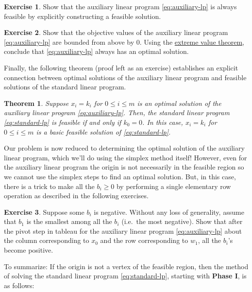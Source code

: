 \documentclass[
]{book}
\newtheorem{theorem}{Theorem}[chapter]
\theoremstyle{definition}
\theoremstyle{definition}
\theoremstyle{definition}
\newtheorem{exercise}{Exercise}[chapter]
\theoremstyle{definition}
\theoremstyle{remark}
\begin{document}
\begin{exercise}
Show that the auxiliary linear program \eqref{eq:auxiliary-lp} is always feasible by explicitly constructing a feasible solution.
\end{exercise}

\begin{exercise}
Show that the objective values of the auxiliary linear program \eqref{eq:auxiliary-lp} are bounded from above by 0. Using the \href{https://en.wikipedia.org/wiki/Extreme_value_theorem}{extreme value theorem}, conclude that \eqref{eq:auxiliary-lp} always has an optimal solution.
\end{exercise}

Finally, the following theorem (proof left as an exercise) establishes an explicit connection between optimal solutions of the auxiliary linear program and feasible solutions of the standard linear program.

\begin{theorem}
\protect\hypertarget{thm:auxiliary-lp}{}\label{thm:auxiliary-lp}Suppose \(x_i = k_i\) for \(0 \le i \le m\) is an optimal solution of the auxiliary linear program \eqref{eq:auxiliary-lp}. Then, the standard linear program \eqref{eq:standard-lp} is feasible if and only if \(k_0 = 0\). In this case, \(x_i = k_i\) for \(0 \le i \le m\) is a basic feasible solution of \eqref{eq:standard-lp}.
\end{theorem}

Our problem is now reduced to determining the optimal solution of the auxiliary linear program, which we'll do using the simplex method itself!
However, even for the auxiliary linear program the origin is not necessarily in the feasible region so we cannot use the simplex steps to find an optimal solution.
But, in this case, there is a trick to make all the \(b_i \ge 0\) by performing a single elementary row operation as described in the following exercises.

\begin{exercise}
Suppose some \(b_i\) is negative.
Without any loss of generality, assume that \(b_1\) is the smallest among all the \(b_i\) (i.e.~the most negative).
Show that after the pivot step in tableau for the auxiliary linear program \eqref{eq:auxiliary-lp} about the column corresponding to \(x_0\) and the row corresponding to \(w_1\), all the \(b_i\)'s become positive.
\end{exercise}

To summarize: If the origin is not a vertex of the feasible region, then the method of solving the standard linear program \eqref{eq:standard-lp}, starting with \textbf{Phase I}, is as follows:
\end{document}
